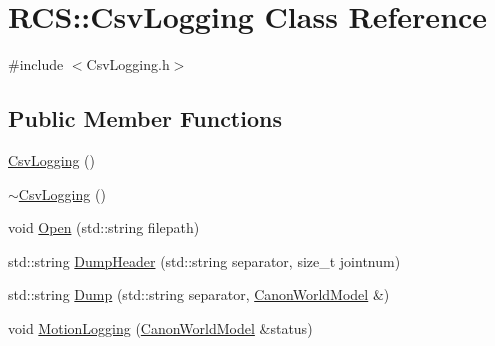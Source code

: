 \hypertarget{classRCS_1_1CsvLogging}{\section{R\-C\-S\-:\-:Csv\-Logging Class Reference}
\label{classRCS_1_1CsvLogging}
}


{\ttfamily \#include $<$Csv\-Logging.\-h$>$}

\subsection*{Public Member Functions}
\begin{DoxyCompactItemize}
\item 
\hyperlink{classRCS_1_1CsvLogging_a782ead0f695535aab12fa214e8dbc05a}{Csv\-Logging} ()
\item 
\hyperlink{classRCS_1_1CsvLogging_a07f5ee24be0cbd81cdae3e535afbd405}{$\sim$\-Csv\-Logging} ()
\item 
void \hyperlink{classRCS_1_1CsvLogging_a9e601dcdba26c5db3b8d3aa74f798e71}{Open} (std\-::string filepath)
\item 
std\-::string \hyperlink{classRCS_1_1CsvLogging_a66ca0cc6d49f9654352591df13fe8bcd}{Dump\-Header} (std\-::string separator, size\-\_\-t jointnum)
\item 
std\-::string \hyperlink{classRCS_1_1CsvLogging_adedf7b2943db9004687fe667fc51ddb1}{Dump} (std\-::string separator, \hyperlink{structRCS_1_1CanonWorldModel}{Canon\-World\-Model} \&)
\item 
void \hyperlink{classRCS_1_1CsvLogging_a876f8da2ffadb827f0f1a61c74e53818}{Motion\-Logging} (\hyperlink{structRCS_1_1CanonWorldModel}{Canon\-World\-Model} \&status)
\end{DoxyCompactItemize}


